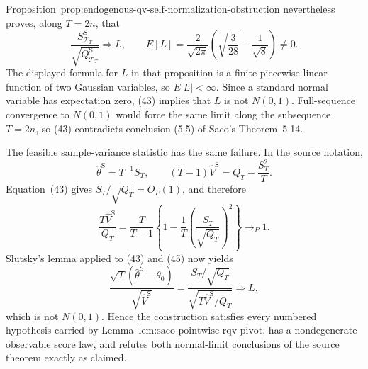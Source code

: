 Proposition~\(\text{prop:endogenous-qv-self-normalization-obstruction}\) nevertheless proves, along \(T=2n\), that
\[
 \frac{S_{\mathcal T_T}^{\mathrm S}}{\sqrt{Q_{\mathcal T_T}^{\mathrm S}}}
 \Longrightarrow L,
 \qquad
 E[L]=\frac2{\sqrt{2\pi}}
 \left(\sqrt{\frac3{28}}-\frac1{\sqrt8}\right)\ne0.
\tag{43}
\]
The displayed formula for \(L\) in that proposition is a finite piecewise-linear function of two Gaussian variables, so \(E|L|<\infty\).  Since a standard normal variable has expectation zero, (43) implies that \(L\) is not \(N(0,1)\).  Full-sequence convergence to \(N(0,1)\) would force the same limit along the subsequence \(T=2n\), so (43) contradicts conclusion (5.5) of Saco's Theorem~5.14.

The feasible sample-variance statistic has the same failure.  In the source notation,
\[
 \widehat\theta^{\mathrm S}=T^{-1}S_T,
 \qquad
 (T-1)\widehat V^{\mathrm S}=Q_T-\frac{S_T^2}{T}.
\tag{44}
\]
Equation~(43) gives \(S_T/\sqrt{Q_T}=O_P(1)\), and therefore
\[
 \frac{T\widehat V^{\mathrm S}}{Q_T}
 =\frac{T}{T-1}
 \left\{1-\frac1T\left(\frac{S_T}{\sqrt{Q_T}}\right)^2\right\}
 \to_P1.
\tag{45}
\]
Slutsky's lemma applied to (43) and (45) now yields
\[
 \frac{\sqrt T(\widehat\theta^{\mathrm S}-\theta_0)}{\sqrt{\widehat V^{\mathrm S}}}
 =\frac{S_T/\sqrt{Q_T}}{\sqrt{T\widehat V^{\mathrm S}/Q_T}}
 \Longrightarrow L,
\tag{46}
\]
which is not \(N(0,1)\).  Hence the construction satisfies every numbered hypothesis carried by Lemma~\(\text{lem:saco-pointwise-rqv-pivot}\), has a nondegenerate observable score law, and refutes both normal-limit conclusions of the source theorem exactly as claimed.
